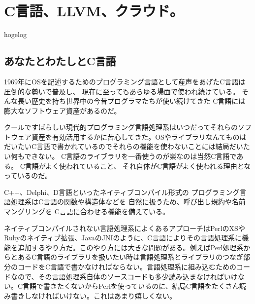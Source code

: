 
\chapter{C言語、LLVM、クラウド。}

\begin{flushright}
 {\headfont hogelog}
\end{flushright}

\section{あなたとわたしとC言語}
1969年にOSを記述するためのプログラミング言語として産声をあげたC言語は圧倒的な勢いで普及し、
現在に至ってもあらゆる場面で使われ続けている。
そんな長い歴史を持ち世界中の今昔プログラマたちが使い続けてきた
C言語には膨大なソフトウェア資産があるのだ。

クールですばらしい現代的プログラミング言語処理系はいつだってそれらのソフトウェア資産を有効活用するかに苦心してきた。OSやライブラリなんてものはだいたいC言語で書かれているのでそれらの機能を使わないことには結局だいたい何もできない。
C言語のライブラリを一番使うのが楽なのは当然C言語である。
C言語がよく使われていること、
それ自体がC言語がよく使われる理由となっているのだ。

C++、Delphi、D言語といったネイティブコンパイル形式の
プログラミング言語処理系はC言語の関数や構造体などを
自然に扱うため、呼び出し規約や名前マングリングを
C言語に合わせる機能を備えている。

ネイティブコンパイルされない言語処理系によくあるアプローチはPerlのXSやRubyのネイティブ拡張、JavaのJNIのように、C言語によりその言語処理系に機能を追加するやり方だ。このやり方には大きな問題がある。例えばPerl処理系からとあるC言語のライブラリを扱いたい時は言語処理系とライブラリのつなぎ部分のコードをC言語で書かなければならない。言語処理系に組み込むためのコードなので、その言語処理系自体のソースコードも多少読み込まなければいけない。C言語で書きたくないからPerlを使っているのに、結局C言語をたくさん読み書きしなければいけない。これはあまり嬉しくない。


